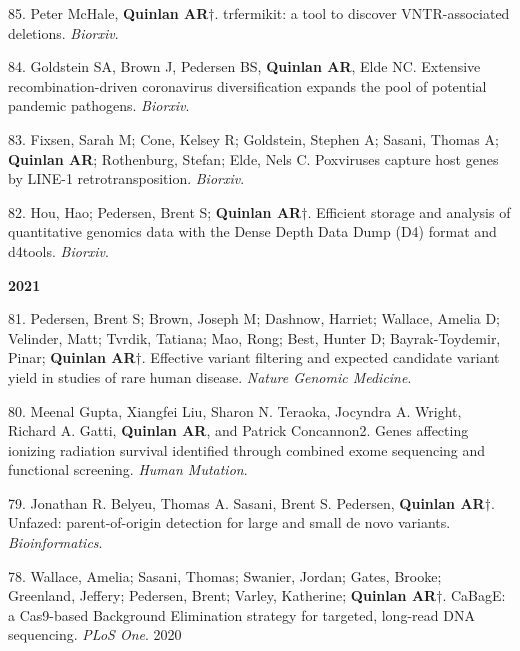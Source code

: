 \documentclass[margin,line]{cv}
\begin{document}
\begin{resume}
\begin{list}{*}{}
    \item[85.] Peter McHale, \textbf{Quinlan AR}$\dagger$. trfermikit: a tool to discover VNTR-associated deletions. \emph{Biorxiv}. 

    \item[84.] Goldstein SA, Brown J, Pedersen BS, \textbf{Quinlan AR}, Elde NC. Extensive recombination-driven coronavirus diversification expands the pool of potential pandemic pathogens. \emph{Biorxiv}. 

    \item[83.] Fixsen, Sarah M; Cone, Kelsey R; Goldstein, Stephen A; Sasani, Thomas A; \textbf{Quinlan AR}; Rothenburg, Stefan; Elde, Nels C. Poxviruses capture host genes by LINE-1 retrotransposition. \emph{Biorxiv}. 

    \item[82.] Hou, Hao; Pedersen, Brent S; \textbf{Quinlan AR}$\dagger$.  Efficient storage and analysis of quantitative genomics data with the Dense Depth Data Dump (D4) format and d4tools. \emph{Biorxiv}. 

 
    \end{list}    

    \textbf{2021} \\

    \begin{list}{*}{}

    \item[81.] Pedersen, Brent S; Brown, Joseph M; Dashnow, Harriet; Wallace, Amelia D; Velinder, Matt; Tvrdik, Tatiana; Mao, Rong; Best, Hunter D; Bayrak-Toydemir, Pinar; \textbf{Quinlan AR}$\dagger$.  Effective variant filtering and expected candidate variant yield in studies of rare human disease. \emph{Nature Genomic Medicine}. 

    \item[80.] Meenal Gupta, Xiangfei Liu, Sharon N. Teraoka, Jocyndra A. Wright, Richard A. Gatti, \textbf{Quinlan AR}, and Patrick Concannon2. Genes affecting ionizing radiation survival identified through combined exome sequencing and functional screening. \emph{Human Mutation}. 

    \item[79.] Jonathan R. Belyeu, Thomas A. Sasani, Brent S. Pedersen, \textbf{Quinlan AR}$\dagger$. Unfazed: parent-of-origin detection for large and small de novo variants. \emph{Bioinformatics}. 

    \item[78.] Wallace, Amelia; Sasani, Thomas; Swanier, Jordan; Gates, Brooke; Greenland, Jeffery; Pedersen, Brent; Varley, Katherine; \textbf{Quinlan AR}$\dagger$.  CaBagE: a Cas9-based Background Elimination strategy for targeted, long-read DNA sequencing. \emph{PLoS One}. 2020


\end{list}
\end{resume}
\end{document}
